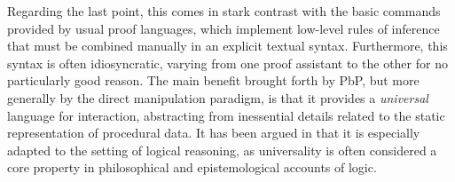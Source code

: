Regarding the last point, this comes in stark contrast with the basic commands
provided by usual proof languages, which implement low-level rules of inference
that must be combined manually in an explicit textual syntax. Furthermore, this syntax is often idiosyncratic, varying from
one proof assistant to the other for no particularly good reason. The main benefit brought forth by PbP, but
more generally by the direct manipulation paradigm, is that it provides a
\emph{universal} language for interaction, abstracting from inessential details
related to the static representation of procedural data. It has
been argued in \cite{Chaudhuri2013} that it is especially adapted to the setting
of logical reasoning, as universality is often considered a core property in
philosophical and epistemological accounts of logic.